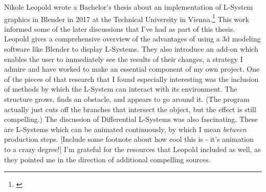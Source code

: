 \documentclass[12pt,twoside]{reedthesis}
\begin{document}
	Nikole Leopold wrote a Bachelor's thesis about an implementation of L-System graphics in Blender in 2017 at the Technical University in Vienna.\footnote{\cite{Leopold2017}} This work informed some of the later discussions that I've had as part of this thesis. Leopold gives a comprehensive overview of the advantages of using a 3d modeling software like Blender to display L-Systems. They also introduce an add-on which enables the user to immediately see the results of their changes, a strategy I admire and have worked to make an essential component of my own project. One of the pieces of that research that I found especially interesting was the inclusion of methods by which the L-System can interact with its environment. The structure grows, finds an obstacle, and appears to go around it. (The program actually just cuts off the branches that intersect the object, but the effect is still compelling.) The discussion of Differential L-Systems was also fascinating. These are L-Systems which can be animated continuously, by which I mean \textit{between} production steps. [Include some footnote about how cool this is - it's animation to a crazy degree!] I'm grateful for the resources that Leopold included as well, as they pointed me in the direction of additional compelling sources.
	
\end{document}
